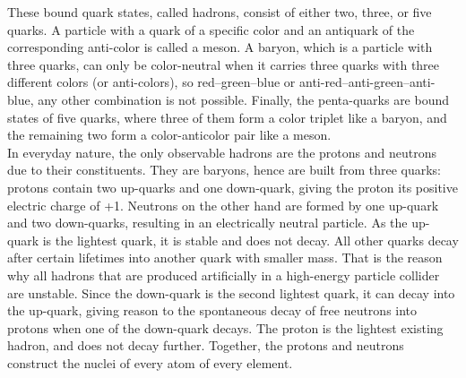 These bound quark states, called hadrons, consist of either two, three, or five quarks.
A particle with a quark of a specific color and an antiquark of the corresponding anti-color is called a meson.
A baryon, which is a particle with three quarks, can only be color-neutral when it carries three quarks with three different colors (or anti-colors), so red--green--blue or anti-red--anti-green--anti-blue, any other combination is not possible.
Finally, the penta-quarks are bound states of five quarks, where three of them form a color triplet like a baryon, and the remaining two form a color-anticolor pair like a meson.\\
In everyday nature, the only observable hadrons are the protons and neutrons due to their constituents.
They are baryons, hence are built from three quarks:
protons contain two up-quarks and one down-quark, giving the proton its positive electric charge of +1.
Neutrons on the other hand are formed by one up-quark and two down-quarks, resulting in an electrically neutral particle. 
As the up-quark is the lightest quark, it is stable and does not decay.
All other quarks decay after certain lifetimes into another quark with smaller mass.
That is the reason why all hadrons that are produced artificially in a high-energy particle collider are unstable.
Since the down-quark is the second lightest quark, it can decay into the up-quark, giving reason to the spontaneous decay of free neutrons into protons when one of the down-quark decays.
The proton is the lightest existing hadron, and does not decay further.
Together, the protons and neutrons construct the nuclei of every atom of every element.

